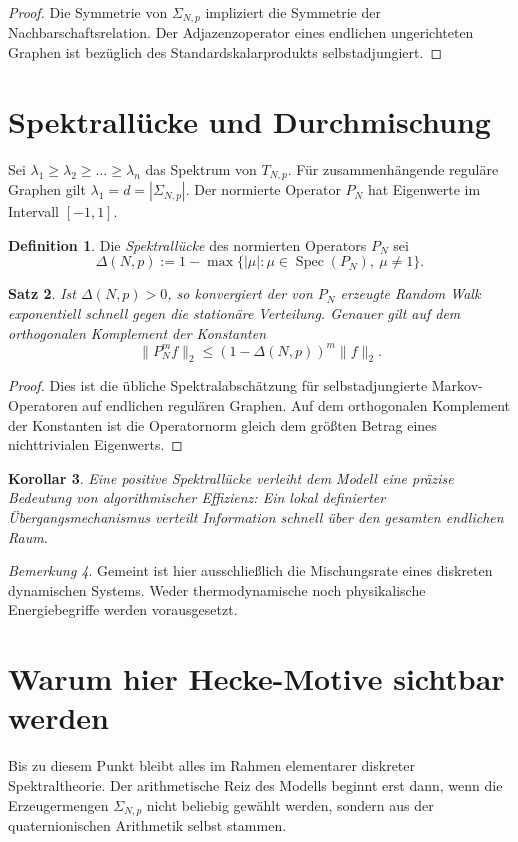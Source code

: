 \documentclass[12pt,a4paper]{article}
\theoremstyle{plain}
\newtheorem{satz}{Satz}[section]
\newtheorem{korollar}[satz]{Korollar}
\theoremstyle{definition}
\newtheorem{definition}[satz]{Definition}
\theoremstyle{remark}
\newtheorem{bemerkung}[satz]{Bemerkung}
\newcommand{\SNp}{\Sigma_{N,p}}
\newcommand{\TNp}{T_{N,p}}
\newcommand{\PN}{P_N}
\begin{document}
\begin{proof}
Die Symmetrie von \(\SNp\) impliziert die Symmetrie der Nachbarschaftsrelation. Der Adjazenzoperator eines endlichen ungerichteten Graphen ist bezüglich des Standardskalarprodukts selbstadjungiert.
\end{proof}

\section{Spektrallücke und Durchmischung}
Sei \(\lambda_1\ge \lambda_2\ge \dots \ge \lambda_n\) das Spektrum von \(\TNp\). Für zusammenhängende reguläre Graphen gilt \(\lambda_1=d=|\SNp|\). Der normierte Operator \(\PN\) hat Eigenwerte im Intervall \([-1,1]\).

\begin{definition}
Die \emph{Spektrallücke} des normierten Operators \(\PN\) sei
\[
\Delta(N,p):=1-\max\{ |\mu| : \mu\in \operatorname{Spec}(\PN),\ \mu\neq 1\}.
\]
\end{definition}

\begin{satz}
Ist \(\Delta(N,p)>0\), so konvergiert der von \(\PN\) erzeugte Random Walk exponentiell schnell gegen die stationäre Verteilung. Genauer gilt auf dem orthogonalen Komplement der Konstanten
\[
\|\PN^m f\|_2 \le (1-\Delta(N,p))^m \|f\|_2.
\]
\end{satz}

\begin{proof}
Dies ist die übliche Spektralabschätzung für selbstadjungierte Markov-Operatoren auf endlichen regulären Graphen. Auf dem orthogonalen Komplement der Konstanten ist die Operatornorm gleich dem größten Betrag eines nichttrivialen Eigenwerts.
\end{proof}

\begin{korollar}
Eine positive Spektrallücke verleiht dem Modell eine präzise Bedeutung von \emph{algorithmischer Effizienz}: Ein lokal definierter Übergangsmechanismus verteilt Information schnell über den gesamten endlichen Raum.
\end{korollar}

\begin{bemerkung}
Gemeint ist hier ausschließlich die Mischungsrate eines diskreten dynamischen Systems. Weder thermodynamische noch physikalische Energiebegriffe werden vorausgesetzt.
\end{bemerkung}

\section{Warum hier Hecke-Motive sichtbar werden}
Bis zu diesem Punkt bleibt alles im Rahmen elementarer diskreter Spektraltheorie. Der arithmetische Reiz des Modells beginnt erst dann, wenn die Erzeugermengen \(\SNp\) nicht beliebig gewählt werden, sondern aus der quaternionischen Arithmetik selbst stammen.
\end{document}
